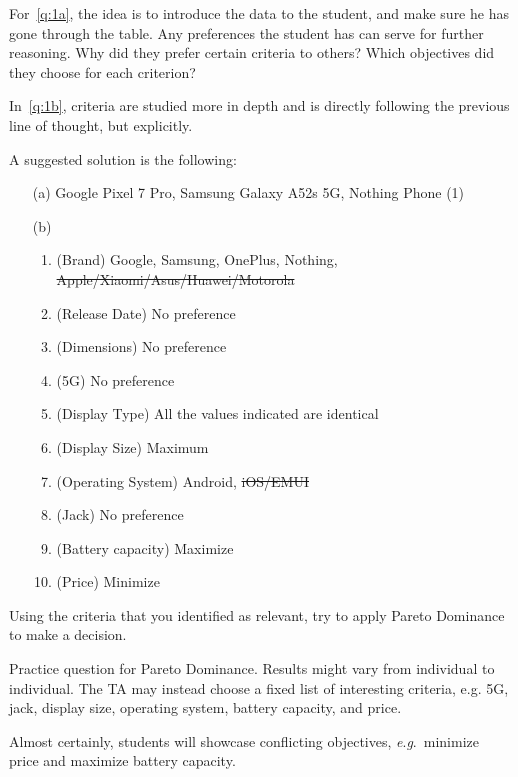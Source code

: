 \documentclass[answers, 10pt, UKenglish]{exam}
\begin{document}
\begin{questions}
\begin{solutionorbox}
{		For~\cref{q:1a}, the idea is to introduce the data to the 
		student, and make sure he has gone through the table. Any preferences
		the student has can serve for further reasoning. Why did they prefer
		certain criteria to others? Which objectives did they choose for each
		criterion?

		In~\cref{q:1b}, criteria are studied more in depth and is directly
		following the previous line of thought, but explicitly.

		A suggested solution is the following:

		\begin{enumerate}
			\item[(a)] Google Pixel 7 Pro, Samsung Galaxy A52s 5G, Nothing Phone (1)
			\item [(b)] \begin{enumerate}
				\item (Brand) Google, Samsung, OnePlus, Nothing, \sout{Apple/Xiaomi/Asus/Huawei/Motorola}
				\item (Release Date) No preference
				\item (Dimensions) No preference
				\item (5G) No preference
				\item (Display Type) All the values indicated are identical
				\item (Display Size) Maximum
				\item (Operating System) Android, \sout{iOS/EMUI}
				\item (Jack) No preference
				\item (Battery capacity) Maximize
				\item (Price) Minimize
			\end{enumerate}
		\end{enumerate}
	}
	\end{solutionorbox}
	
	\question\label{q:2}%
	Using the criteria that you identified as relevant, try to apply Pareto
	Dominance to make a decision.
	
	\begin{solutionorbox}
	{
		\color{red}
		Practice question for Pareto Dominance. Results might vary from
		individual to individual. The TA may instead choose a fixed
		list of  interesting criteria, e.g. 5G, jack, display size,
		operating system, battery capacity, and price.

		Almost certainly, students will showcase conflicting
		objectives, \textit{e}.\textit{g}.\ minimize price and maximize
		battery capacity.

}
\end{solutionorbox}
\end{questions}
\end{document}
